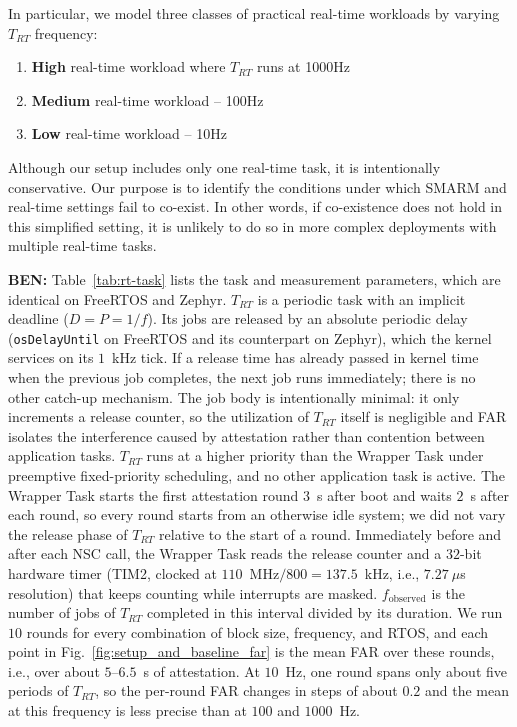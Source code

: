 \documentclass{ieeeaccess}
\DeclareRobustCommand{\ben}[1]{{\color{BENcolor}\textbf{BEN:} #1}}
\begin{document}
In particular, we model three classes of practical real-time workloads by varying $T_{RT}$ frequency:
\begin{enumerate}
    \item \textbf{High} real-time workload where $T_{RT}$ runs at 1000Hz
    \item \textbf{Medium} real-time workload -- 100Hz
    \item \textbf{Low} real-time workload -- 10Hz
\end{enumerate}

Although our setup includes only one real-time task, it is intentionally conservative.
Our purpose is to identify the conditions under which SMARM and real-time settings fail to co-exist.
In other words, if co-existence does not hold in this simplified setting, it is unlikely to do so in more complex deployments with multiple real-time tasks.

\ben{Table~\ref{tab:rt-task} lists the task and measurement parameters, which are identical on FreeRTOS and Zephyr.
$T_{RT}$ is a periodic task with an implicit deadline ($D = P = 1/f$).
Its jobs are released by an absolute periodic delay (\texttt{osDelayUntil} on FreeRTOS and its counterpart on Zephyr), which the kernel services on its $1$~kHz tick.
If a release time has already passed in kernel time when the previous job completes, the next job runs immediately; there is no other catch-up mechanism.
The job body is intentionally minimal: it only increments a release counter, so the utilization of $T_{RT}$ itself is negligible and FAR isolates the interference caused by attestation rather than contention between application tasks.
$T_{RT}$ runs at a higher priority than the Wrapper Task under preemptive fixed-priority scheduling, and no other application task is active.
The Wrapper Task starts the first attestation round $3$~s after boot and waits $2$~s after each round, so every round starts from an otherwise idle system; we did not vary the release phase of $T_{RT}$ relative to the start of a round.
Immediately before and after each NSC call, the Wrapper Task reads the release counter and a $32$-bit hardware timer (TIM2, clocked at $110$~MHz$/800 = 137.5$~kHz, i.e., $7.27~\mu$s resolution) that keeps counting while interrupts are masked.
$f_{\text{observed}}$ is the number of jobs of $T_{RT}$ completed in this interval divided by its duration.
We run $10$ rounds for every combination of block size, frequency, and RTOS, and each point in Fig.~\ref{fig:setup_and_baseline_far} is the mean FAR over these rounds, i.e., over about $5$--$6.5$~s of attestation.
At $10$~Hz, one round spans only about five periods of $T_{RT}$, so the per-round FAR changes in steps of about $0.2$ and the mean at this frequency is less precise than at $100$ and $1000$~Hz.}
\end{document}
